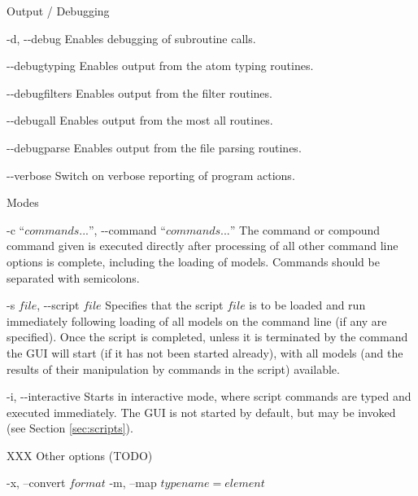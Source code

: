 \begin{optlist}{Output / Debugging}

	\item[-d, {-}{-}debug\its]
		Enables debugging of subroutine calls.
	
	\item[{-}{-}debugtyping\its]
		Enables output from the atom typing routines.
	
	\item[{-}{-}debugfilters\its]
		Enables output from the filter routines.
	
	\item[{-}{-}debugall\its]
		Enables output from the most all routines.

	\item[{-}{-}debugparse\its]
		Enables output from the file parsing routines.
		
	\item[{-}{-}verbose\its]
		Switch on verbose reporting of program actions.

\end{optlist}

\begin{optlist}{Modes}

	\item[-c ``$commands...$'', {-}{-}command ``$commands...$''\its]
		The command or compound command given is executed directly after processing of all other command line options is complete, including the loading of models. Commands should be separated with semicolons.

	\item[-s $file$, {-}{-}script $file$\its]
		Specifies that the script $file$ is to be loaded and run immediately following loading of all models on the command line (if any are specified). Once the script is completed, unless it is terminated by the  command the GUI will start (if it has not been started already), with all models (and the results of their manipulation by commands in the script) available.

	\item[-i, {-}{-}interactive\its]
		Starts \progname{} in interactive mode, where script commands are typed and executed immediately. The GUI is not started by default, but may be invoked (see Section \ref{sec:scripts}).
 
\end{optlist}


XXX Other options (TODO)

-x, --convert $format$ 
-m, --map $typename=element$
